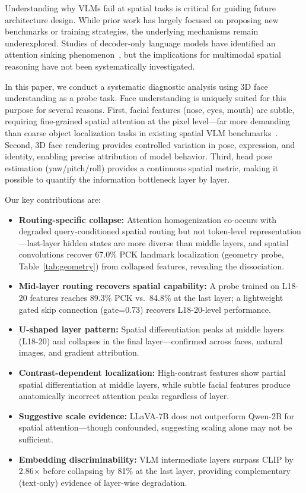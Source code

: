 \documentclass[10pt,twocolumn,letterpaper]{article}
\begin{document}
Understanding why VLMs fail at spatial tasks is critical for guiding future architecture design. While prior work has largely focused on proposing new benchmarks or training strategies, the underlying mechanisms remain underexplored. Studies of decoder-only language models have identified an attention sinking phenomenon~\cite{attention_sinking}, but the implications for multimodal spatial reasoning have not been systematically investigated.

In this paper, we conduct a systematic diagnostic analysis using 3D face understanding as a probe task. Face understanding is uniquely suited for this purpose for several reasons. First, facial features (nose, eyes, mouth) are subtle, requiring fine-grained spatial attention at the pixel level---far more demanding than coarse object localization tasks in existing spatial VLM benchmarks~\cite{SpatialVLM}. Second, 3D face rendering provides controlled variation in pose, expression, and identity, enabling precise attribution of model behavior. Third, head pose estimation (yaw/pitch/roll) provides a continuous spatial metric, making it possible to quantify the information bottleneck layer by layer.

Our key contributions are:
\begin{itemize}
    \item \textbf{Routing-specific collapse:} Attention homogenization co-occurs with degraded query-conditioned spatial routing but not token-level representation---last-layer hidden states are more diverse than middle layers, and spatial convolutions recover 67.0\% PCK landmark localization (geometry probe, Table~\ref{tab:geometry}) from collapsed features, revealing the dissociation.
    \item \textbf{Mid-layer routing recovers spatial capability:} A probe trained on L18-20 features reaches 89.3\% PCK vs.\ 84.8\% at the last layer; a lightweight gated skip connection (gate=0.73) recovers L18-20-level performance.
    \item \textbf{U-shaped layer pattern:} Spatial differentiation peaks at middle layers (L18-20) and collapses in the final layer---confirmed across faces, natural images, and gradient attribution.
    \item \textbf{Contrast-dependent localization:} High-contrast features show partial spatial differentiation at middle layers, while subtle facial features produce anatomically incorrect attention peaks regardless of layer.
    \item \textbf{Suggestive scale evidence:} LLaVA-7B does not outperform Qwen-2B for spatial attention---though confounded, suggesting scaling alone may not be sufficient.
    \item \textbf{Embedding discriminability:} VLM intermediate layers surpass CLIP by 2.86$\times$ before collapsing by 81\% at the last layer, providing complementary (text-only) evidence of layer-wise degradation.
\end{itemize}
\end{document}
